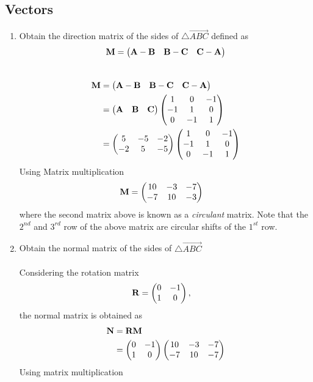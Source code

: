 \documentclass[10pt]{book}
\begin{document}
\subsection{Vectors}
\begin{enumerate}[label=\thesubsection.\arabic*.,ref=\thesubsection.\theenumi]
\item Obtain the direction matrix of the sides of $\triangle \vec{ABC}$ defined as 
\begin{align}
\mathbf{M} = 	\begin{pmatrix}\mathbf{A}-\mathbf{B} & \mathbf{B}-\mathbf{C} & \mathbf{C}-\mathbf{A}\end{pmatrix}
\end{align}
\\
\solution 
\begin{align}
\mathbf{M} &= \begin{pmatrix}\mathbf{A}-\mathbf{B} & \mathbf{B}-\mathbf{C} & \mathbf{C}-\mathbf{A}\end{pmatrix} \\
	&= \begin{pmatrix}\mathbf{A} & \mathbf{B} &\mathbf{C}\end{pmatrix} \begin{pmatrix}1 & 0 & -1 \\ -1 & 1 & 0 \\ 0 & -1 & 1\end{pmatrix} \\
 &=\begin{pmatrix}5 & -5 & -2 \\ -2 & 5 & -5\end{pmatrix}\begin{pmatrix}1 & 0 & -1 \\ -1 & 1 & 0 \\ 0 & -1 & 1\end{pmatrix} 
 \end{align}
 Using Matrix multiplication 
 \begin{align}
 \mathbf{M} &=\begin{pmatrix}10 & -3 & -7 \\ -7 & 10 & -3\end{pmatrix}
\end{align}
where the second matrix above is known as a {\em circulant} matrix.  Note that the $2^{nd}$ and $3^{rd}$ row of the above matrix are circular shifts of the $1^{st}$ row.
\item Obtain the normal matrix  of the sides of $\triangle \vec{ABC}$ \\
\solution\\
Considering the rotation matrix
\begin{align}
\mathbf{R} &= \begin{pmatrix}0 & -1 \\ 1 & 0\end{pmatrix},
\end{align}
the normal matrix is obtained as
\begin{align}
\mathbf{N} &= \mathbf{R}\mathbf{M} \\
&=\begin{pmatrix}0 & -1 \\ 1 & 0\end{pmatrix}\begin{pmatrix}10 & -3 & -7 \\ -7 & 10 & -7\end{pmatrix} 
\end{align}
Using matrix multiplication 
\begin{align}

\end{align}
\end{enumerate}
\end{document}
